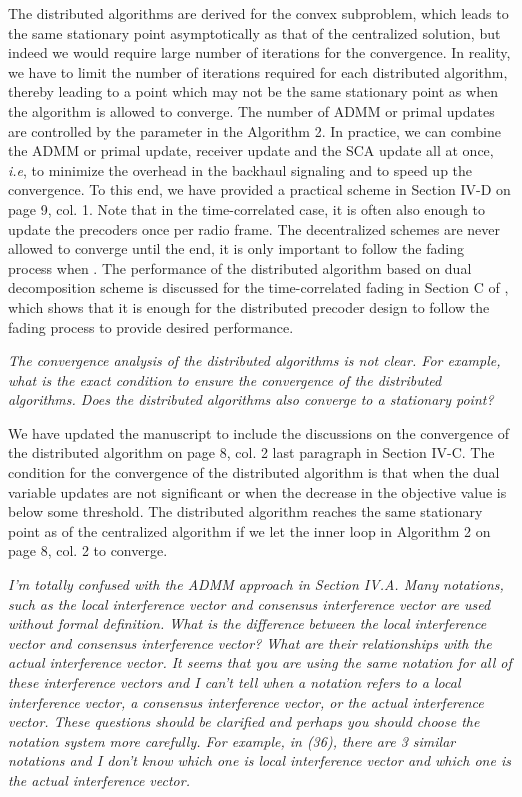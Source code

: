 \begin{itemize}
\resp The distributed algorithms are derived for the convex subproblem, which leads to the same stationary point asymptotically as that of the centralized solution, but indeed we would require large number of iterations for the convergence. In reality, we have to limit the number of iterations required for each distributed algorithm, thereby leading to a point which may not be the same stationary point as when the algorithm is allowed to converge. The number of ADMM or primal updates are controlled by the parameter  in the Algorithm 2. In practice, we can combine the ADMM or primal update, receiver update and the SCA update all at once, \textit{i.e},  to minimize the overhead in the backhaul signaling and to speed up the convergence. To this end, we have provided a practical scheme in Section IV-D on page 9, col. 1. Note that in the time-correlated case, it is often also enough to update the precoders once per radio frame. The decentralized schemes are never allowed to converge until the end, it is only important to follow the fading process when . The performance of the distributed algorithm based on dual decomposition scheme is discussed for the time-correlated fading in Section C of \cite{tolli2011decentralized}, which shows that it is enough for the distributed precoder design to follow the fading process to provide desired performance.

 \textit{The convergence analysis of the distributed algorithms is not clear. For example, what is the exact condition to ensure the convergence of the distributed algorithms. Does the distributed algorithms also converge to a stationary point?}

\resp We have updated the manuscript to include the discussions on the convergence of the distributed algorithm on page 8, col. 2 last paragraph in Section IV-C. The condition for the convergence of the distributed algorithm is that when the dual variable updates are not significant or when the decrease in the objective value is below some threshold. The distributed algorithm reaches the same stationary point as of the centralized algorithm if we let the inner loop in Algorithm 2 on page 8, col. 2 to converge.

 \textit{I’m totally confused with the ADMM approach in Section IV.A. Many notations, such as the local interference vector and consensus interference vector are used without formal definition. What is the difference between the local interference vector and consensus interference vector? What are their relationships with the actual interference vector. It seems that you are using the same notation for all of these interference vectors and I can’t tell when a notation refers to a local interference vector, a consensus interference vector, or the actual interference vector. These questions should be clarified and perhaps you should choose the notation system more carefully. For example, in (36), there are 3 similar notations and I don’t know which one is local interference vector and which one is the actual interference vector.}


\end{itemize}
